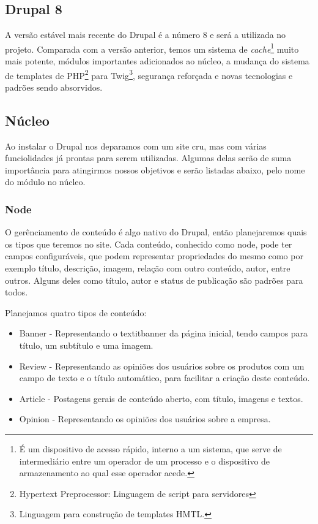 \subsection{Drupal 8}

A versão estável mais recente do Drupal é a número 8 e será a utilizada no projeto. Comparada com a versão anterior, temos um sistema de \textit{cache}\footnote{É um dispositivo de acesso rápido, interno a um sistema, que serve de intermediário entre um operador de um processo e o dispositivo de armazenamento ao qual esse operador acede\cite{Cache}.} muito mais potente, módulos importantes adicionados ao núcleo, a mudança do sistema de templates de PHP\footnote{Hypertext Preprocessor: Linguagem de script para servidores} para Twig\footnote{Linguagem para construção de templates HMTL.}, segurança reforçada e novas tecnologias e padrões sendo absorvidos. 

\subsection{Núcleo}

Ao instalar o Drupal nos deparamos com um site cru, mas com várias funciolidades já prontas para serem utilizadas. Algumas delas serão de suma importância para atingirmos nossos objetivos e serão listadas abaixo, pelo nome do módulo no núcleo.

\subsubsection{Node}
O gerênciamento de conteúdo é algo nativo do Drupal, então planejaremos quais os tipos que teremos no site. Cada conteúdo, conhecido como node, pode ter campos configuráveis, que podem representar propriedades do mesmo como por exemplo título, descrição, imagem, relação com outro conteúdo, autor, entre outros. Alguns deles como título, autor e status de publicação são padrões para todos.

Planejamos quatro tipos de conteúdo:
\begin{itemize}
  \item Banner - Representando o textit{banner} da página inicial, tendo campos para título, um subtítulo e uma imagem.
  \item Review - Representando as opiniões dos usuários sobre os produtos com um campo de texto e o título automático, para facilitar a criação deste conteúdo.
  \item Article - Postagens gerais de conteúdo aberto, com título, imagens e textos.
  \item Opinion - Representando os opiniões dos usuários sobre a empresa.
\end{itemize}


